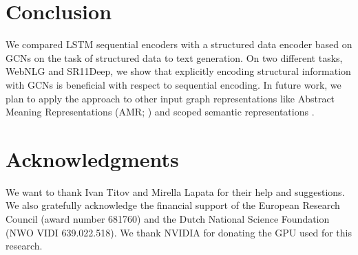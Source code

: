 \documentclass[11pt,a4paper,dvipsnames]{article}
\begin{document}
\vspace{-0.5em}
\section{Conclusion}
\label{sec:conslusion}
\vspace{-0.5em}
We compared LSTM sequential encoders with a structured 
data encoder based on GCNs on the task of structured data 
to text generation.
On two different tasks, WebNLG and SR11Deep, we
show that explicitly encoding structural information 
with GCNs is beneficial with respect to sequential encoding. 
In future work, we plan to apply the approach to other
input graph representations like Abstract Meaning Representations (AMR; \cite{banarescu2013abstract})
and scoped semantic representations \cite{Noord2018LREC}.


 \vspace{-1ex}
 \section*{Acknowledgments}
 \vspace{-1ex}
We want to thank Ivan Titov and Mirella Lapata for their help and suggestions.
We also gratefully acknowledge the financial support
of the European Research Council (award number 681760)
and the Dutch National Science Foundation (NWO VIDI 639.022.518). 
We thank NVIDIA for donating the GPU used for this research.





\newpage

\appendix
\end{document}
